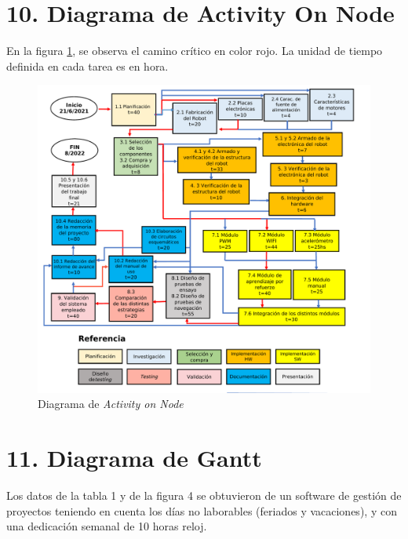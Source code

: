\documentclass[
11pt, %
codirector, %
]{charter}
\begin{document}
\pagebreak

\section{10. Diagrama de Activity On Node}
\label{sec:AoN}

En la figura \ref{fig:AoN}, se observa el camino crítico en color rojo. La unidad de tiempo definida en cada tarea es en hora.
 
\begin{figure}[htpb]
\centering 
\includegraphics[width=\textwidth]{./Figuras/AoN.pdf}
\caption{Diagrama de \textit{Activity on Node}}
\label{fig:AoN}
\end{figure}

\vspace{4cm}

\section{11. Diagrama de Gantt}
\label{sec:gantt}

Los datos de la tabla 1 y de la figura 4 se obtuvieron de un software de gestión de proyectos teniendo en cuenta los días no laborables (feriados y vacaciones), y con una dedicación semanal de 10 horas reloj.
\end{document}
